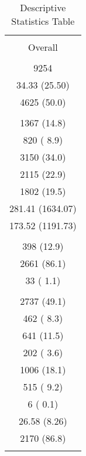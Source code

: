 
\begin{table}[!htbp] \centering 
  \caption{Descriptive Statistics Table} 
  \label{} 
\begin{tabular}{@{\extracolsep{5pt}} c} 
\\[-1.8ex]\hline 
\hline \\[-1.8ex] 
Overall \\ 
\hline \\[-1.8ex] 
  9254 \\ 
 34.33 (25.50) \\ 
  4625 (50.0)  \\ 
   \\ 
  1367 (14.8)  \\ 
   820 ( 8.9)  \\ 
  3150 (34.0)  \\ 
  2115 (22.9)  \\ 
  1802 (19.5)  \\ 
281.41 (1634.07) \\ 
173.52 (1191.73) \\ 
   \\ 
   398 (12.9)  \\ 
  2661 (86.1)  \\ 
    33 ( 1.1)  \\ 
   \\ 
  2737 (49.1)  \\ 
   462 ( 8.3)  \\ 
   641 (11.5)  \\ 
   202 ( 3.6)  \\ 
  1006 (18.1)  \\ 
   515 ( 9.2)  \\ 
     6 ( 0.1)  \\ 
 26.58 (8.26) \\ 
  2170 (86.8)  \\ 
\hline \\[-1.8ex] 
\end{tabular} 
\end{table} 
